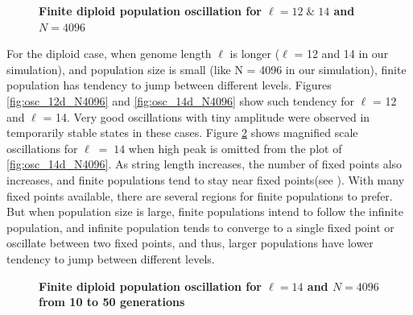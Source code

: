 \begin{figure}[h]
\begin{center}
\caption{\textbf{Finite diploid population oscillation for $\ell = 12 \;\&\; 14$ and $N = 4096$}}
\label{oscillation_12d_14d_N4096}
\end{center}
\end{figure}

For the diploid case, when genome length $\ell$ is longer ($\ell$ = 12 and 14 in our simulation), 
and population size is small (like N = 4096 in our simulation), finite population has tendency to 
jump between different levels. Figures \ref{fig:osc_12d_N4096} and \ref{fig:osc_14d_N4096} show such tendency for 
$\ell$ = 12 and $\ell$ = 14. Very good oscillations with tiny amplitude were observed in temporarily stable states 
in these cases. Figure \ref{oscillation_14d_N4096} shows magnified scale oscillations for $\ell \;=\; 14$ 
when high peak is omitted from the plot of \ref{fig:osc_14d_N4096}. 
As string length increases, the number of fixed points also increases, 
and finite populations tend to stay near fixed points(see \cite{Vose1999}). With many fixed points available, 
there are several regions for finite populations to prefer. 
But when population size is large, finite populations intend to follow the infinite population, 
and infinite population tends to 
converge to a single fixed point or oscillate between two fixed points, and thus, 
larger populations have lower tendency to jump between different levels.

\begin{figure}[h]
\begin{center}
 \hspace{-3em}%
\caption{\textbf{Finite diploid population oscillation for $\ell = 14$ and $N = 4096$ from 10 to 50 generations}}
\label{oscillation_14d_N4096}
\end{center}
\end{figure}

